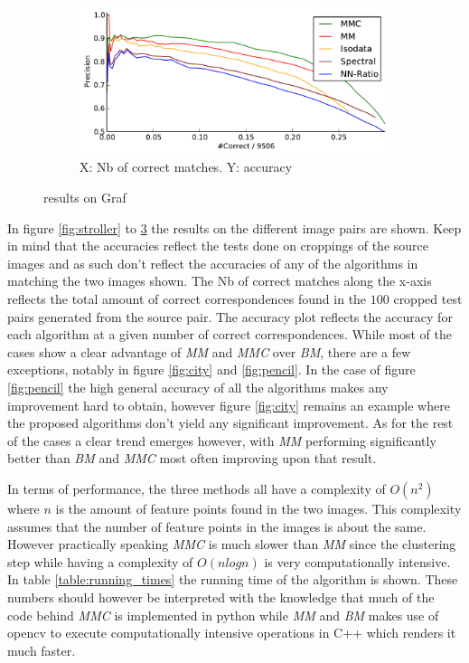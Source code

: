 \documentclass{article}
\begin{document}
\begin{figure}
{\begin{subfigure}[t]{0.35\textwidth}
			\label{fig:graf3}
		\end{subfigure}%
		~ %
		\begin{subfigure}[t]{0.35\textwidth}
			\centering
			\includegraphics[width=\textwidth]{images/result_graf}
			\caption{X: Nb of correct matches. Y: accuracy}
			\label{fig:result_graf}
		\end{subfigure}%
	}%
	\label{fig:graf}
	\caption{results on Graf}
\end{figure}

In figure \ref{fig:stroller} to \ref{fig:graf} the results on the 
different image pairs are shown. Keep in mind that the accuracies 
reflect the tests done on croppings of the source images and as such 
don't reflect the accuracies of any of the algorithms in matching the 
two images shown. The Nb of correct matches along the x-axis reflects 
the total amount of correct correspondences found in the $100$ cropped 
test pairs generated from the source pair. The accuracy plot reflects 
the accuracy for each algorithm at a given number of correct 
correspondences. While most of the cases show a clear advantage of 
\emph{MM} and \emph{MMC} over \emph{BM}, there are a few exceptions, 
notably in figure \ref{fig:city} and \ref{fig:pencil}. In the case of 
figure \ref{fig:pencil} the high general accuracy of all the algorithms 
makes any improvement hard to obtain, however figure \ref{fig:city} 
remains an example where the proposed algorithms don't yield any 
significant improvement. As for the rest of the cases a clear trend 
emerges however, with \emph{MM} performing significantly better than 
\emph{BM} and \emph{MMC} most often improving upon that result.

In terms of performance, the three methods all have a complexity of 
$O(n^2)$ where $n$ is the amount of feature points found in the two 
images. This complexity assumes that the number of feature points in the 
images is about the same. However practically speaking \emph{MMC} is 
much slower than \emph{MM} since the clustering step while having a 
complexity of $O(nlogn)$ is very computationally intensive. In table 
\ref{table:running_times} the running time of the algorithm is shown.  
These numbers should however be interpreted with the knowledge that much 
of the code behind \emph{MMC} is implemented in python while \emph{MM} 
and \emph{BM} makes use of opencv to execute computationally intensive 
operations in C++ which renders it much faster.
\end{document}
